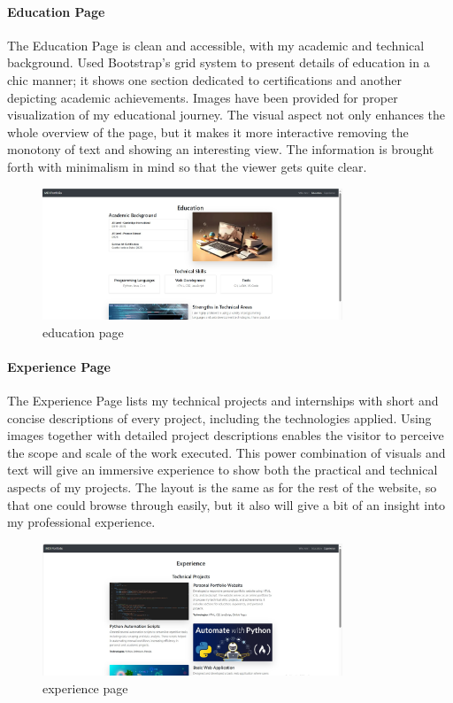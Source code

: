 \documentclass[a4paper,12pt]{article}
\begin{document}
\paragraph{Education Page}
The Education Page is clean and accessible, with my academic and technical background. Used Bootstrap's grid system to present details of education in a chic manner; it shows one section dedicated to certifications and another depicting academic achievements. Images have been provided for proper visualization of my educational journey. The visual aspect not only enhances the whole overview of the page, but it makes it more interactive removing the monotony of text and showing an interesting view. The information is brought forth with minimalism in mind so that the viewer gets quite clear.

\begin{figure}[h!]
    \centering
    \includegraphics[width=0.8\textwidth]{education.jpg} %
    \caption{education page}
\end{figure}

\paragraph{Experience Page}
The Experience Page lists my technical projects and internships with short and concise descriptions of every project, including the technologies applied. Using images together with detailed project descriptions enables the visitor to perceive the scope and scale of the work executed. This power combination of visuals and text will give an immersive experience to show both the practical and technical aspects of my projects. The layout is the same as for the rest of the website, so that one could browse through easily, but it also will give a bit of an insight into my professional experience.

\begin{figure}[h!]
    \centering
    \includegraphics[width=0.8\textwidth]{experience.jpg} %
    \caption{experience page}
\end{figure}
\end{document}
